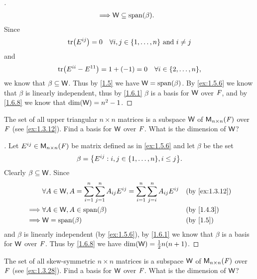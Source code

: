 \begin{proof}[]
\begin{align*}
    \implies & \W \subseteq \spn{\beta}.
  \end{align*}
  Since
  \[
    \tr[E^{i j}] = 0 \quad \forall i, j \in \set{1, \dots, n} \text{ and } i \neq j
  \]
  and
  \[
    \tr[E^{i i} - E^{1 1}] = 1 + (-1) = 0 \quad \forall i \in \set{2, \dots, n},
  \]
  we know that \(\beta \subseteq \mathsf{W}\).
  Thus by \cref{1.5} we have \(\W = \spn{\beta}\).
  By \cref{ex:1.5.6} we know that \(\beta\) is linearly independent, thus by \cref{1.6.1} \(\beta\) is a basis for \(\mathsf{W}\) over \(\mathit{F}\), and by \cref{1.6.8} we know that \(\dim(\mathsf{W}) = n^2 - 1\).
\end{proof}

\begin{ex}\label{ex:1.6.16}
  The set of all upper triangular \(n \times n\) matrices is a subspace \(\mathsf{W}\) of \(\mathsf{M}_{{n} \times n}({\mathit{F}})\) over \(\mathit{F}\) (see \cref{ex:1.3.12}).
  Find a basis for \(\mathsf{W}\) over \(\mathit{F}\).
  What is the dimension of \(\mathsf{W}\)?
\end{ex}

\begin{proof}[]
  Let \(E^{i j} \in \mathsf{M}_{{n} \times n}({\mathit{F}})\) be matrix defined as in \cref{ex:1.5.6} and let \(\beta\) be the set
  \[
    \beta = \set{E^{i j} : i, j \in \set{1, \dots, n}, i \leq j}.
  \]
  Clearly \(\beta \subseteq \mathsf{W}\).
  Since
  \begin{align*}
             & \forall A \in \W, A = \sum_{i = 1}^n \sum_{j = 1}^n A_{i j} E^{i j} = \sum_{i = 1}^n \sum_{j = i}^n A_{i j} E^{i j} &  & \text{(by \cref{ex:1.3.12})} \\
    \implies & \forall A \in \W, A \in \spn{\beta}                                                                                 &  & \text{(by \cref{1.4.3})}     \\
    \implies & \W = \spn{\beta}                                                                                                    &  & \text{(by \cref{1.5})}
  \end{align*}
  and \(\beta\) is linearly independent (by \cref{ex:1.5.6}), by \cref{1.6.1} we know that \(\beta\) is a basis for \(\mathsf{W}\) over \(\mathit{F}\).
  Thus by \cref{1.6.8} we have \(\dim(\mathsf{W}) = \frac{1}{2} n(n + 1)\).
\end{proof}

\begin{ex}\label{ex:1.6.17}
  The set of all skew-symmetric \(n \times n\) matrices is a subspace \(\mathsf{W}\) of \(\mathsf{M}_{{n} \times n}({\mathit{F}})\) over \(\mathit{F}\) (see \cref{ex:1.3.28}).
  Find a basis for \(\mathsf{W}\) over \(\mathit{F}\).
  What is the dimension of \(\mathsf{W}\)?
\end{ex}

